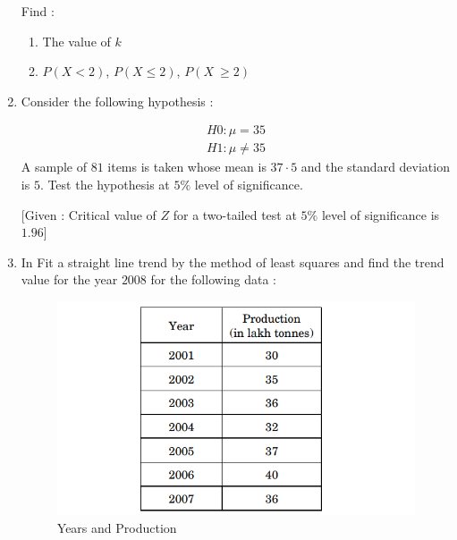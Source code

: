 \begin{enumerate}[label=\thesection.\arabic*.,ref=\thesection.\theenumi]
Find :
\begin{enumerate}[label=(\roman*)]
 \item The value of $k$
 
 \item $P(X < 2)$, $P(X \leq 2)$, $P(X\ \geq 2)$
 
 \end{enumerate}

\item Consider the following hypothesis :

\begin {align}
H0 : \mu =  35\\
H1 : \mu \neq 35
\end{align}
A sample of $81$ items is taken whose mean is $37·5$ and the standard deviation is $5$. Test the hypothesis at $5\%$ level of significance.

[Given : Critical value of $Z$ for a two-tailed test at $5\%$ level of significance is $1.96$]

\item In  Fit a straight line trend by the method of least squares and find the trend 
value for the year $2008$ for the following data :

\begin{figure}[H]
        \centering
        \includegraphics[width=\columnwidth]{./figs/Screenshot (37).png}
        \caption{Years and Production}
        \label{fig:fig6.png}
    \end{figure}
\end{enumerate}
